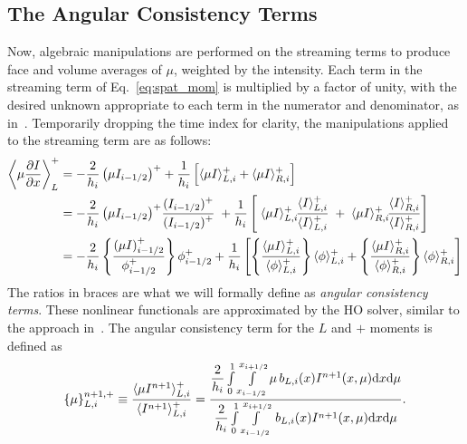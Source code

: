 \subsection{The Angular Consistency Terms}

Now, algebraic manipulations are performed on the streaming terms to produce face and
volume averages of $\mu$, weighted by the intensity.  Each term in the streaming
term of Eq.~\eqref{eq:spat_mom} is multiplied by a factor of unity, with the desired unknown appropriate to each term
in the numerator and denominator, as in~\cite{wolters}.  Temporarily dropping the time
index for clarity, the manipulations applied to
the streaming term are as follows:
    \begin{align} \label{eq:line1}
        {\displaystyle \left \langle \mu \frac{\partial I}{\partial x} \right \rangle_L^+ } & = 
        -\frac{\displaystyle2}{\displaystyle h_i} \left(\mu I_{i-1/2}\right)^+ + \frac{\displaystyle 1}{\displaystyle h_i}\left[
    \langle \mu I \rangle_{L,i}^+ + \langle \mu I \rangle_{R,i}^+ \right] \\
        & =  
        -\frac{\displaystyle2}{\displaystyle h_i} \left(\mu I_{i-1/2}\right)^+
        \! \frac{\displaystyle(I_{i-1/2})^+}{\displaystyle(I_{i-1/2})^+}  \;    + \frac{\displaystyle 1}{\displaystyle h_i}\left[ \;
        \langle \mu I \rangle_{L,i}^+ \! \frac{\displaystyle\langle I \rangle_{L,i}^+}{\displaystyle\langle I \rangle_{L,i}^+} \; + \; \langle \mu
        I \rangle_{R,i}^+ \! \frac{\displaystyle\langle I \rangle_{R,i}^+}{\displaystyle\langle I \rangle_{R,i}^+} \right] \\
        & =  -\frac{\displaystyle2}{\displaystyle h_i} \left\{ {\frac{\displaystyle \left( \mu I
            \right)^+_{i-1/2} }{\displaystyle\phi^+_{i-1/2}}} \right\}
            \phi^+_{i-1/2} + \frac{\displaystyle 1}{\displaystyle h_i} \left[ \left\{ {\frac{\displaystyle\langle \mu
        I \rangle_{L,i}^+}{\displaystyle\langle \phi \rangle_{L,i}^+}} \right \} \langle \phi \rangle_{L,i}^+  +
        \left\{ {\frac{\displaystyle\langle \mu I \rangle_{R,i}^+}{\displaystyle\langle \phi \rangle_{R,i}^+}} \right\}
    \langle \phi \rangle_{R,i}^+ \right]
    \end{align}
The ratios in braces are what we will formally define as \emph{angular consistency terms}.
These nonlinear functionals are approximated by the HO solver, similar to the approach
in~\cite{wolters}.  The angular consistency
term for the $L$ and $+$ moments is defined as
\begin{equation}\label{eq:ang_cons_vol}
    \left\{ {\mu} \right\}_{L,i}^{n+1,+} \equiv \frac{\langle \mu I^{n+1} \rangle_{L,i}^+}{\langle I^{n+1} \rangle_{L,i}^+} =  \frac{
{\displaystyle \frac{2}{h_i}} \int\limits_0^1 \int\limits_{x_{i-1/2}}^{x_{i+1/2}} \mu \, b_{L,i}(x)
I^{n+1}(x,\mu) \mathrm{d} x \mathrm{d} \mu } 
{{\displaystyle \frac{2}{h_i}} \int\limits_0^1 \int\limits_{x_{i-1/2}}^{x_{i+1/2}} \, b_{L,i}(x)
I^{n+1}(x,\mu) \mathrm{d} x \mathrm{d} \mu } .
\end{equation}
